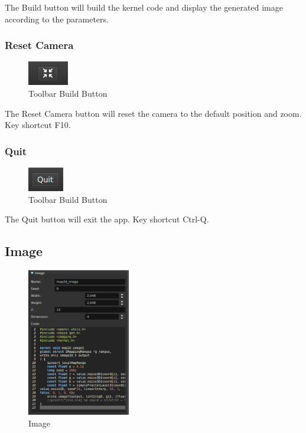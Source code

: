 The Build button will build the kernel code and display the generated image
according to the parameters.

\subsubsection{Reset Camera}

\begin{figure}[h]
\centering
\includegraphics{imgs/toolbar-reset-camera-0.png}
\caption{Toolbar Build Button}\label{fig:toolbar-reset-camera-0}
\end{figure}

The Reset Camera button will reset the camera to the default position and zoom.
Key shortcut F10.

\subsubsection{Quit}

\begin{figure}[h]
\centering
\includegraphics{imgs/toolbar-quit-0.png}
\caption{Toolbar Build Button}\label{fig:toolbar-quit-0}
\end{figure}

The Quit button will exit the app. Key shortcut Ctrl-Q.

\subsection{Image}

\begin{figure}[h]
\centering
\includegraphics[width=0.4\textwidth]{imgs/main-image-0.png}
\caption{Image}\label{fig:main-image-0}
\end{figure}

